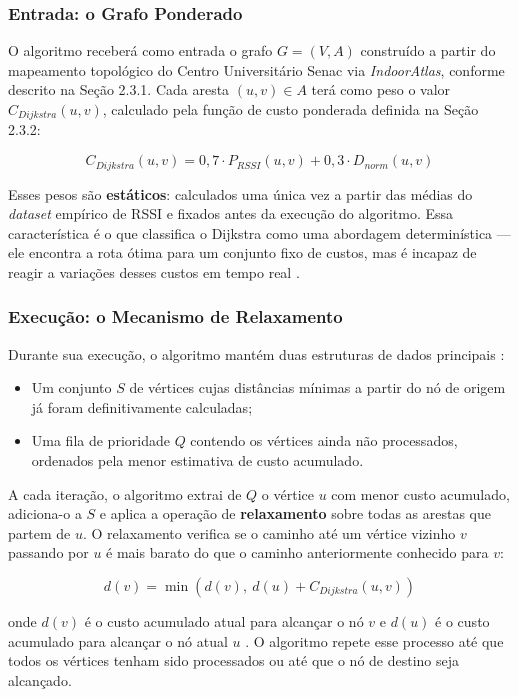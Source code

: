 \documentclass[
    12pt,                %
    openright,           %
    oneside,             %
    a4paper,             %
    english,             %
    brazil               %
]{abntex2}
\begin{document}
\subsubsection*{Entrada: o Grafo Ponderado}

O algoritmo receberá como entrada o grafo $G = (V, A)$ construído a partir do
mapeamento topológico do Centro Universitário Senac via \textit{IndoorAtlas},
conforme descrito na Seção 2.3.1. Cada aresta $(u, v) \in A$ terá como peso o
valor $C_{Dijkstra}(u,v)$, calculado pela função de custo ponderada definida na
Seção 2.3.2:

$$ C_{Dijkstra}(u,v) = 0{,}7 \cdot P_{RSSI}(u,v) + 0{,}3 \cdot D_{norm}(u,v) $$

Esses pesos são \textbf{estáticos}: calculados uma única vez a partir das médias
do \textit{dataset} empírico de RSSI e fixados antes da execução do algoritmo.
Essa característica é o que classifica o Dijkstra como uma abordagem determinística
--- ele encontra a rota ótima para um conjunto fixo de custos, mas é incapaz de
reagir a variações desses custos em tempo real \cite{Pham2025}.

\subsubsection*{Execução: o Mecanismo de Relaxamento}

Durante sua execução, o algoritmo mantém duas estruturas de dados principais
\cite{Cormen2009}:

\begin{itemize}
    \item Um conjunto $S$ de vértices cujas distâncias mínimas a partir do nó de
    origem já foram definitivamente calculadas;
    \item Uma fila de prioridade $Q$ contendo os vértices ainda não processados,
    ordenados pela menor estimativa de custo acumulado.
\end{itemize}

A cada iteração, o algoritmo extrai de $Q$ o vértice $u$ com menor custo
acumulado, adiciona-o a $S$ e aplica a operação de \textbf{relaxamento} sobre
todas as arestas que partem de $u$. O relaxamento verifica se o caminho até um
vértice vizinho $v$ passando por $u$ é mais barato do que o caminho anteriormente
conhecido para $v$:

$$ d(v) = \min\left(d(v),\ d(u) + C_{Dijkstra}(u,v)\right) $$

onde $d(v)$ é o custo acumulado atual para alcançar o nó $v$ e $d(u)$ é o custo
acumulado para alcançar o nó atual $u$ \cite{Cormen2009}. O algoritmo repete esse
processo até que todos os vértices tenham sido processados ou até que o nó de
destino seja alcançado.
\end{document}
